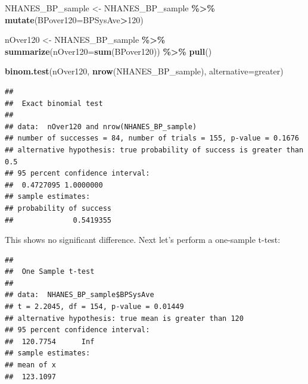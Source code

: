 \documentclass[
  12pt,
]{book}
\newenvironment{Shaded}{\begin{snugshade}}{\end{snugshade}}
\newcommand{\AttributeTok}[1]{\textcolor[rgb]{0.13,0.29,0.53}{#1}}
\newcommand{\DecValTok}[1]{\textcolor[rgb]{0.00,0.00,0.81}{#1}}
\newcommand{\FunctionTok}[1]{\textcolor[rgb]{0.13,0.29,0.53}{\textbf{#1}}}
\newcommand{\NormalTok}[1]{#1}
\newcommand{\OtherTok}[1]{\textcolor[rgb]{0.56,0.35,0.01}{#1}}
\newcommand{\SpecialCharTok}[1]{\textcolor[rgb]{0.81,0.36,0.00}{\textbf{#1}}}
\newcommand{\StringTok}[1]{\textcolor[rgb]{0.31,0.60,0.02}{#1}}
\begin{document}
\begin{Shaded}
\begin{Highlighting}[]
\NormalTok{NHANES\_BP\_sample }\OtherTok{\textless{}{-}}\NormalTok{ NHANES\_BP\_sample }\SpecialCharTok{\%\textgreater{}\%}
  \FunctionTok{mutate}\NormalTok{(}\AttributeTok{BPover120=}\NormalTok{BPSysAve}\SpecialCharTok{\textgreater{}}\DecValTok{120}\NormalTok{)}

\NormalTok{nOver120 }\OtherTok{\textless{}{-}}\NormalTok{ NHANES\_BP\_sample }\SpecialCharTok{\%\textgreater{}\%}
  \FunctionTok{summarize}\NormalTok{(}\AttributeTok{nOver120=}\FunctionTok{sum}\NormalTok{(BPover120)) }\SpecialCharTok{\%\textgreater{}\%}
  \FunctionTok{pull}\NormalTok{()}

\FunctionTok{binom.test}\NormalTok{(nOver120, }\FunctionTok{nrow}\NormalTok{(NHANES\_BP\_sample), }\AttributeTok{alternative=}\StringTok{\textquotesingle{}greater\textquotesingle{}}\NormalTok{)}
\end{Highlighting}
\end{Shaded}

\begin{verbatim}
## 
##  Exact binomial test
## 
## data:  nOver120 and nrow(NHANES_BP_sample)
## number of successes = 84, number of trials = 155, p-value = 0.1676
## alternative hypothesis: true probability of success is greater than 0.5
## 95 percent confidence interval:
##  0.4727095 1.0000000
## sample estimates:
## probability of success 
##              0.5419355
\end{verbatim}

This shows no significant difference. Next let's perform a one-sample t-test:

\begin{Shaded}
\end{Shaded}

\begin{verbatim}
## 
##  One Sample t-test
## 
## data:  NHANES_BP_sample$BPSysAve
## t = 2.2045, df = 154, p-value = 0.01449
## alternative hypothesis: true mean is greater than 120
## 95 percent confidence interval:
##  120.7754      Inf
## sample estimates:
## mean of x 
##  123.1097
\end{verbatim}
\end{document}
